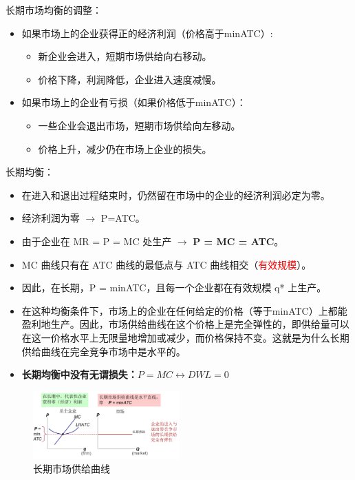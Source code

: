 \documentclass[12pt, a4paper]{article}
\begin{document}
长期市场均衡的调整：
\begin{itemize}
    \item 如果市场上的企业获得正的经济利润（价格高于minATC）:
    \begin{itemize}
        \item 新企业会进入，短期市场供给向右移动。
        \item 价格下降，利润降低，企业进入速度减慢。
    \end{itemize}
    \item 如果市场上的企业有亏损（如果价格低于minATC）：
    \begin{itemize}
        \item 一些企业会退出市场，短期市场供给向左移动。
        \item 价格上升，减少仍在市场上企业的损失。
    \end{itemize}
\end{itemize}

长期均衡：
\begin{itemize}
    \item 在进入和退出过程结束时，仍然留在市场中的企业的经济利润必定为零。
    \item 经济利润为零 $\rightarrow$ P=ATC。
    \item 由于企业在 MR = P = MC 处生产 $\rightarrow$ \textbf{P = MC = ATC}。
    \item MC 曲线只有在 ATC 曲线的最低点与 ATC 曲线相交（\textcolor{red}{有效规模}）。
    \item 因此，在长期，P = minATC，且每一个企业都在有效规模 q* 上生产。
    \item 在这种均衡条件下，市场上的企业在任何给定的价格（等于minATC）上都能盈利地生产。因此，市场供给曲线在这个价格上是完全弹性的，即供给量可以在这一价格水平上无限量地增加或减少，而价格保持不变。这就是为什么长期供给曲线在完全竞争市场中是水平的。
    \item \textbf{长期均衡中没有无谓损失：$P = MC \leftrightarrow DWL = 0$}
\end{itemize}

\begin{figure}[H]
    \centering
    \includegraphics[width=0.5\textwidth]{长期竞争市场供给曲线.png}
    \caption{长期市场供给曲线}
\end{figure}
\end{document}
